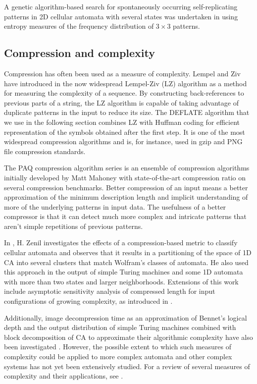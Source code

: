 A genetic algorithm-based search for spontaneously occurring self-replicating
patterns in 2D cellular automata with several states was undertaken in
\parencite{bilottaARTIFICIALMICROWORLDSPART2011} using entropy measures of the
frequency distribution of $3\times 3$ patterns.

\subsection{Compression and complexity}
Compression has often been used as a measure of complexity. Lempel and Ziv have
introduced in \parencite{lempelComplexityFiniteSequences1976} the now widespread
Lempel-Ziv (LZ) algorithm as a method for measuring the complexity of a
sequence. By constructing back-references to previous parts of a string, the LZ
algorithm is capable of taking advantage of duplicate patterns in the input to
reduce its size. The DEFLATE algorithm that we use in the following section
combines LZ with Huffman coding for efficient representation of the symbols
obtained after the first step. It is one of the most widespread compression
algorithms and is, for instance, used in gzip and PNG file compression standards.

The PAQ compression algorithm series \parencite{mahoneyFastTextCompression2000}
is an ensemble of compression algorithms initially developed by Matt Mahoney
with state-of-the-art compression ratio on several compression benchmarks.
Better compression of an input means a better approximation of the minimum
description length and implicit understanding of more of the underlying patterns
in input data. The usefulness of a better compressor is that it can detect much
more complex and intricate patterns that aren't simple repetitions of previous
patterns.

In \parencite{zenilCompressionBasedInvestigationDynamical2010}, H. Zenil
investigates the effects of a compression-based metric to classify cellular
automata and observes that it results in a partitioning of the space of 1D CA
into several clusters that match Wolfram's classes of automata. He also used
this approach in the output of simple Turing machines and some 1D automata with
more than two states and larger neighborhoods. Extensions of this work include
asymptotic sensitivity analysis of compressed length for input
configurations of growing complexity, as introduced in
\parencite{zenilAsymptoticBehaviorRatios2013,
  zenilWhatNatureLikeComputation2014}.

Additionally, image decompression time as an approximation of Bennet's logical
depth \parencite{bennettLogicalDepthPhysical1995,
  zenilImageCharacterizationClassification2012} and the output distribution of
simple Turing machines combined with block decomposition of CA to approximate
their algorithmic complexity have also been investigated
\parencite{zenilTwodimensionalKolmogorovComplexity2015,
  soler-toscanoCalculatingKolmogorovComplexity2014}. However, the possible
extent to which such measures of complexity could be applied to more complex
automata and other complex systems has not yet been extensively studied. For a
review of several measures of complexity and their applications, see
\parencite{grassbergerRandomnessInformationComplexity1989}.

